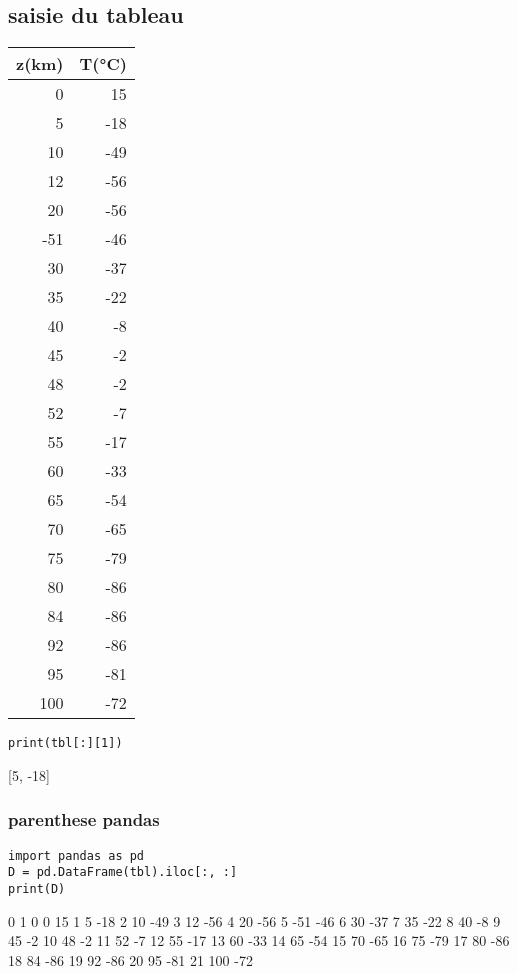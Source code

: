 \documentclass[11pt]{article}
\begin{document}
\subsection{saisie du tableau}
\label{sec:orgedb7f27}
\begin{table}[htbp]
\label{temp}
\centering
\begin{tabular}{rr}
z(km) & T(°C)\\
\hline
0 & 15\\
5 & -18\\
10 & -49\\
12 & -56\\
20 & -56\\
-51 & -46\\
30 & -37\\
35 & -22\\
40 & -8\\
45 & -2\\
48 & -2\\
52 & -7\\
55 & -17\\
60 & -33\\
65 & -54\\
70 & -65\\
75 & -79\\
80 & -86\\
84 & -86\\
92 & -86\\
95 & -81\\
100 & -72\\
\end{tabular}
\end{table}


\begin{verbatim}
print(tbl[:][1])
\end{verbatim}

[5, -18]


\subsubsection{parenthese pandas}
\label{sec:org2c8dd3b}

\begin{verbatim}
import pandas as pd
D = pd.DataFrame(tbl).iloc[:, :]
print(D)
\end{verbatim}

      0   1
0     0  15
1     5 -18
2    10 -49
3    12 -56
4    20 -56
5   -51 -46
6    30 -37
7    35 -22
8    40  -8
9    45  -2
10   48  -2
11   52  -7
12   55 -17
13   60 -33
14   65 -54
15   70 -65
16   75 -79
17   80 -86
18   84 -86
19   92 -86
20   95 -81
21  100 -72
\end{document}

